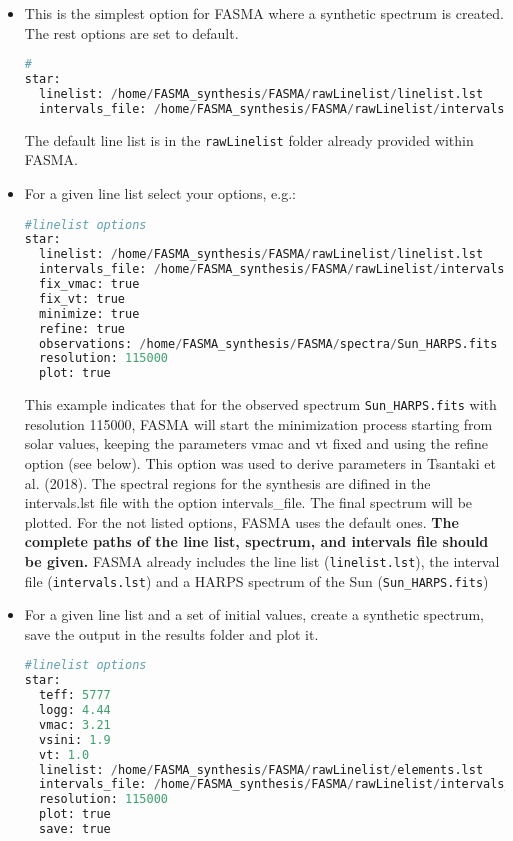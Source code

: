 \documentclass[a4paper,12pt]{article}
\begin{document}
\begin{itemize}
 \item This is the simplest option for FASMA where a synthetic spectrum is created. The rest options are set to default.
 {\footnotesize
 \begin{lstlisting}[language=Python]
#
star:
  linelist: /home/FASMA_synthesis/FASMA/rawLinelist/linelist.lst
  intervals_file: /home/FASMA_synthesis/FASMA/rawLinelist/intervals.lst
\end{lstlisting}
}

The default line list is in the \texttt{rawLinelist} folder already provided within FASMA.
 \item For a given line list select your options, e.g.:
 {\footnotesize
 \begin{lstlisting}[language=Python]
 #linelist options
star:
  linelist: /home/FASMA_synthesis/FASMA/rawLinelist/linelist.lst
  intervals_file: /home/FASMA_synthesis/FASMA/rawLinelist/intervals.lst
  fix_vmac: true
  fix_vt: true
  minimize: true
  refine: true
  observations: /home/FASMA_synthesis/FASMA/spectra/Sun_HARPS.fits
  resolution: 115000
  plot: true
\end{lstlisting}}

This example indicates that for the observed spectrum \texttt{Sun\_HARPS.fits} with resolution 115000, FASMA will start the minimization process starting from solar values, keeping the 
parameters vmac and vt fixed and using the refine option (see below). This option was used to derive parameters in Tsantaki et al. (2018). The spectral regions for the synthesis are 
difined in the intervals.lst file with the option intervals\_file. The final spectrum will be plotted. For the not listed options, FASMA uses the default ones. {\bf The complete paths 
of the line list, spectrum, and intervals file should be given.} FASMA already includes the line list (\texttt{linelist.lst}), the interval file (\texttt{intervals.lst}) and a HARPS 
spectrum of the Sun (\texttt{Sun\_HARPS.fits})

 \item For a given line list and a set of initial values, create a synthetic spectrum, save the output in the results folder and plot it. 
 {\footnotesize

\begin{lstlisting}[language=Python]
 #linelist options
star:
  teff: 5777
  logg: 4.44
  vmac: 3.21
  vsini: 1.9
  vt: 1.0
  linelist: /home/FASMA_synthesis/FASMA/rawLinelist/elements.lst
  intervals_file: /home/FASMA_synthesis/FASMA/rawLinelist/intervals_elements.lst.lst
  resolution: 115000
  plot: true
  save: true
\end{lstlisting}}


\end{itemize}
\end{document}
